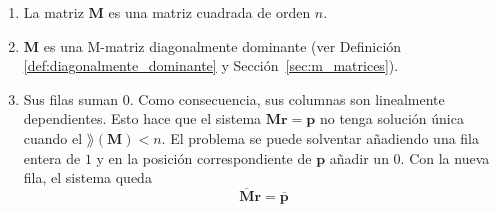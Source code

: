 \begin{enumerate}
\item La matriz $\mathbf{M}$ es una matriz cuadrada de orden $n$.
\item $\mathbf{M}$ es una M-matriz diagonalmente dominante (ver Definición \ref{def:diagonalmente_dominante} y Sección~\ref{sec:m_matrices}).
\item Sus filas suman $0$. Como consecuencia, sus columnas son linealmente dependientes. Esto hace que el sistema  $\mathbf{M r} = \mathbf{p}$ no tenga solución única cuando el $\rang(\mathbf{M}) < n$. El problema se puede solventar añadiendo una fila entera de $1$ y en la posición correspondiente de $\mathbf{p}$ añadir un $0$. Con la nueva fila, el sistema queda 
\begin{equation}
\overline{\mathbf{M}} \mathbf{r} = \overline{\mathbf{p}} \label{eq:massey_general}
\end{equation}
\end{enumerate}

